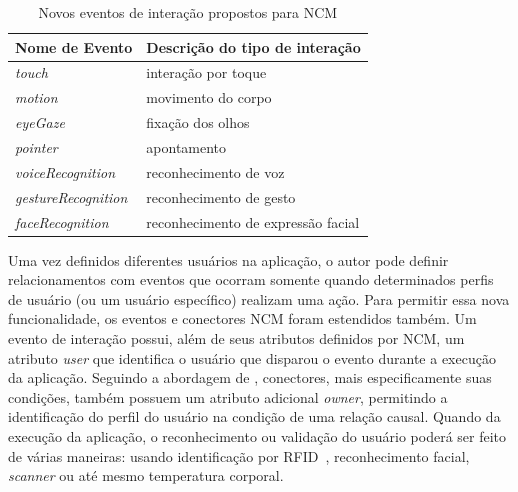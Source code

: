 \begin{table}[h!]
\centering
\caption{Novos eventos de interação propostos para NCM}
\label{tab:eventos}

\begin{tabular}{ m{5cm} | m{7cm} }
    Nome de Evento & Descrição do tipo de interação\\ \hline
    \textit{touch} & interação por toque\\\hline
    \textit{motion} & movimento do corpo\\\hline
    \textit{eyeGaze} & fixação dos olhos\\\hline
    \textit{pointer} & apontamento\\\hline
    \textit{voiceRecognition} & reconhecimento de voz\\\hline
    \textit{gestureRecognition} & reconhecimento de gesto\\\hline
    \textit{faceRecognition} & reconhecimento de expressão facial\\\hline
\end{tabular}
\end{table}

Uma vez definidos diferentes usuários na aplicação, o autor pode definir relacionamentos com eventos que ocorram somente quando determinados perfis de usuário (ou um usuário específico) realizam uma ação. Para permitir essa nova funcionalidade, os eventos e conectores NCM foram estendidos também. Um evento de interação possui, além de seus atributos definidos por NCM, um atributo \textit{user} que identifica o usuário que disparou o evento durante a execução da aplicação. Seguindo a abordagem de \cite{Guedes:2016aa}, conectores, mais especificamente suas condições, também possuem um atributo adicional \textit{owner}, permitindo a identificação do perfil do usuário na condição de uma relação causal. Quando da execução da aplicação, o reconhecimento ou validação do usuário poderá ser feito de várias maneiras: usando identificação por RFID~\cite{want2006introduction}, reconhecimento facial, \textit{scanner} ou até mesmo temperatura corporal. 

